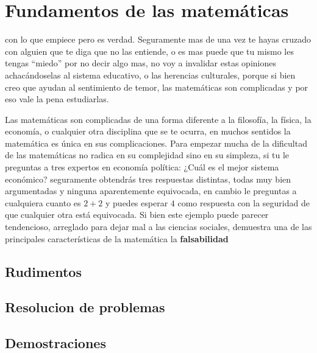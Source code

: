 \chapter{Fundamentos de las matemáticas} %
\label{cha:fundamentos_de_las_matematicas}

\noindent {} con lo
que empiece pero es verdad. Seguramente mas de una vez te hayas cruzado con
alguien que te diga que no las entiende, o es mas puede que tu mismo les tengas
``miedo'' por no decir algo mas, no voy a invalidar estas opiniones
achacándoselas al sistema educativo, o las herencias culturales, porque si bien
creo que ayudan al sentimiento de temor, las matemáticas son complicadas y por
eso vale la pena estudiarlas.

Las matemáticas son complicadas de una forma diferente a la filosofía, la
física, la economía, o cualquier otra disciplina que se te ocurra, en muchos
sentidos la matemática es única en sus complicaciones. Para empezar mucha de la
dificultad de las matemáticas no radica en su complejidad sino en su simpleza,
si tu le preguntas a tres expertos en economía política: ¿Cuál es el mejor
sistema económico? seguramente obtendrás tres respuestas distintas, todas
muy bien argumentadas y ninguna aparentemente equivocada, en cambio le preguntas
a cualquiera cuanto es \(2 + 2\) y puedes esperar \(4\) como respuesta con la
seguridad de que cualquier otra está equivocada. Si bien este ejemplo puede
parecer tendencioso, arreglado para dejar mal a las ciencias sociales, demuestra
una de las principales características de la matemática la \textbf{falsabilidad}

\section{Rudimentos} %
\label{sec:Rudimentos}

\section{Resolucion de problemas} %
\label{sec:resolucion_de_problemas}

\section{Demostraciones} %
\label{sec:demostraciones}

